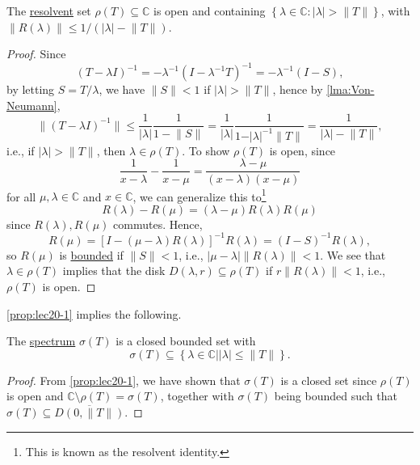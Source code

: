 \begin{proposition}\label{prop:lec20-1}
	The \hyperref[def:regular-point]{resolvent} set \(\rho (T)\subseteq \mathbb{C} \) is open and containing \(\left\{ \lambda \in \mathbb{C} \colon \vert \lambda  \vert > \lVert T \rVert  \right\} \), with \(\lVert R(\lambda ) \rVert \leq 1 / (\vert \lambda  \vert - \lVert T \rVert )\).
\end{proposition}
\begin{proof}
	Since
	\[
		(T-\lambda I)^{-1}
		= - \lambda ^{-1} (I-\lambda ^{-1} T)^{-1}
		= - \lambda ^{-1} (I-S),
	\]
	by letting \(S = T / \lambda \), we have \(\lVert S \rVert < 1\) if \(\vert \lambda \vert > \lVert T \rVert \), hence by \autoref{lma:Von-Neumann},
	\[
		\lVert (T-\lambda I)^{-1} \rVert
		\leq \frac{1}{\vert \lambda  \vert } \frac{1}{1 - \lVert S \rVert }
		= \frac{1}{\vert \lambda  \vert } \frac{1}{1 - \vert \lambda  \vert^{-1} \lVert T \rVert  }
		= \frac{1}{\vert \lambda  \vert - \lVert T \rVert },
	\]
	i.e., if \(\vert \lambda  \vert > \lVert T \rVert \), then \(\lambda \in \rho (T)\). To show \(\rho (T)\) is open, since
	\[
		\frac{1}{x - \lambda } - \frac{1}{x-\mu } = \frac{\lambda -\mu }{(x-\lambda )(x-\mu )}
	\]
	for all \(\mu , \lambda \in \mathbb{C} \) and \(x\in \mathbb{C} \), we can generalize this to\footnote{This is known as the resolvent identity.}
	\[
		R(\lambda ) - R(\mu ) = (\lambda -\mu )R(\lambda )R(\mu )
	\]
	since \(R(\lambda ), R(\mu )\) commutes. Hence,
	\[
		R(\mu )
		= \left[ I-(\mu -\lambda )R(\lambda ) \right] ^{-1} R(\lambda )
		= (I-S)^{-1} R(\lambda ),
	\]
	so \(R(\mu )\) is \hyperref[rmk:bounded-op]{bounded} if \(\lVert S \rVert < 1\), i.e., \(\vert \mu -\lambda  \vert \lVert R(\lambda ) \rVert < 1\). We see that \(\lambda \in \rho (T)\) implies that the disk \(D(\lambda , r) \subseteq \rho (T)\) if \(r \lVert R(\lambda ) \rVert < 1\), i.e., \(\rho (T)\) is open.
\end{proof}

\autoref{prop:lec20-1} implies the following.

\begin{proposition}\label{prop:lec20-2}
	The \hyperref[def:spectrum-point]{spectrum} \(\sigma (T)\) is a closed bounded set with
	\[
		\sigma (T) \subseteq \left\{ \lambda \in \mathbb{C} \mid \vert \lambda \vert \leq \lVert T \rVert \right\}.
	\]
\end{proposition}
\begin{proof}
	From \autoref{prop:lec20-1}, we have shown that \(\sigma (T)\) is a closed set since \(\rho (T)\) is open and \(\mathbb{C} \setminus \rho (T) = \sigma (T)\), together with \(\sigma (T)\) being bounded such that \(\sigma (T) \subseteq \overline{D(0, \lVert T \rVert )}\).
\end{proof}

